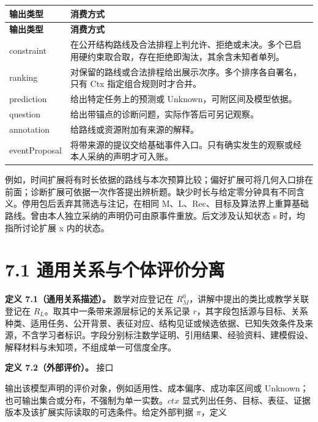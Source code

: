 \documentclass[UTF8,a4paper,zihao=-4,fontset=windows,openany]{ctexbook}
\newcommand{\mcsdisplay}[1]{%
  \par\addvspace{0.7em}%
  \sbox{\mcsmathbox}{\ensuremath{\displaystyle #1}}%
  \ifdim\wd\mcsmathbox>\linewidth
    \noindent\resizebox{\linewidth}{!}{\usebox{\mcsmathbox}}%
  \else
    \noindent\hspace*{\fill}\usebox{\mcsmathbox}\hspace*{\fill}%
  \fi
  \par\addvspace{0.7em}%
}
\def\ensuremath#1{#1}%
\def\operatorname#1{#1}%
\begin{document}
\begingroup\small\setlength{\tabcolsep}{4pt}
\begin{longtable}{>{\raggedright\arraybackslash}p{}>{\raggedright\arraybackslash}p{}}
\toprule
\textbf{输出类型} & \textbf{消费方式} \\
\midrule
\endfirsthead
\toprule
\textbf{输出类型} & \textbf{消费方式} \\
\midrule
\endhead
\bottomrule
\endfoot
\bottomrule
\endlastfoot
constraint & 在公开结构路线及合法排程上判允许、拒绝或未决。多个已启用硬约束取合取，存在拒绝即淘汰，其余含未知者单列。 \\
ranking & 对保留的路线或合法排程给出展示次序。多个排序各自署名，只有 Ctx 指定组合规则时才合并。 \\
prediction & 给出特定任务上的预测或 Unknown，可附区间及模型依据。 \\
question & 给出带锚点的诊断问题，实际作答后可另记观察。 \\
annotation & 给路线或资源附加有来源的解释。 \\
eventProposal & 将带来源的提议交给基础事件入口。只有确实发生的观察或经本人采纳的声明才可入账。 \\
\end{longtable}
\endgroup

例如，时间扩展将有时长依据的路线与本次预算比较；偏好扩展可将几何入口排在前面；诊断扩展可依据一次作答提出辨析题。缺少时长与给定零分钟具有不同含义。停用包后丢弃其筛选与注记，在相同 M、L、Rec、目标及算法界上重算基础路线。曾由本人独立采纳的声明仍可由原事件重放。后文涉及认知状态 s 时，均指所讨论扩展 x 内的状态。

\section{7.1 通用关系与个体评价分离}
\textbf{定义 7.1（通用关系描述）。} 数学对应登记在 \(R_M^0\)，讲解中提出的类比或教学关联登记在 \(R_L\)。取其中一条带来源层标记的关系记录 \(r\)，其字段包括源与目标、关系种类、适用任务、公开背景、表征对应、结构见证或候选依据、已知失效条件及来源，不含学习者标识。字段分别标注数学证明、引用结果、经验资料、建模假设、解释材料与未知项，不组成单一可信度全序。

\textbf{定义 7.2（外部评价）。} 接口


\mcsdisplay{\operatorname{Eval}_x(s,r,ctx)}
\noindent 输出该模型声明的评价对象，例如适用性、成本偏序、成功率区间或 Unknown；也可输出集合或分布，不强制为单一实数。\(ctx\) 显式列出任务、目标、表征、证据版本及该扩展实际读取的可选条件。给定外部判据 \(\pi\)，定义
\end{document}
